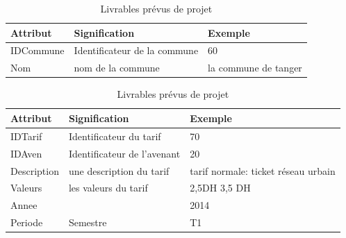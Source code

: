 \documentclass[a4paper]{report}
\begin{document}
\begin{doublespace}
	\begin{table}[H]
		\begin{center}
			\begin{tabularx}{17.5cm}{|X|X|X|}
				\hline
				\textbf{Attribut} & \textbf{Signification}       &
				\textbf{Exemple}                                                        \\
				\hline
				IDCommune         & Identificateur de la commune & 60                   \\
				\hline
				Nom               & nom de la commune            & la commune de tanger \\
				\hline
			\end{tabularx}
			\caption{Livrables prévus de projet}
		\end{center}
	\end{table}

	\begin{table}[H]
		\begin{center}
			\begin{tabularx}{17.5cm}{|X|X|X|}
				\hline
				\textbf{Attribut} & \textbf{Signification}      &
				\textbf{Exemple}                                                        \\
				\hline
				IDTarif           & Identificateur du tarif     & 70                    \\
				\hline
				IDAven            & Identificateur de l'avenant & 20                    \\
				\hline
				Description       & une description du tarif    & tarif normale: ticket
				réseau urbain                                                           \\
				\hline
				Valeurs           & les valeurs du tarif        & 2,5DH 3,5 DH          \\
				\hline
				Annee             &                             & 2014                  \\
				\hline
				Periode           & Semestre                    & T1                    \\
				\hline
			\end{tabularx}
			\caption{Livrables prévus de projet}
		\end{center}
	\end{table}


\end{doublespace}
\end{document}
